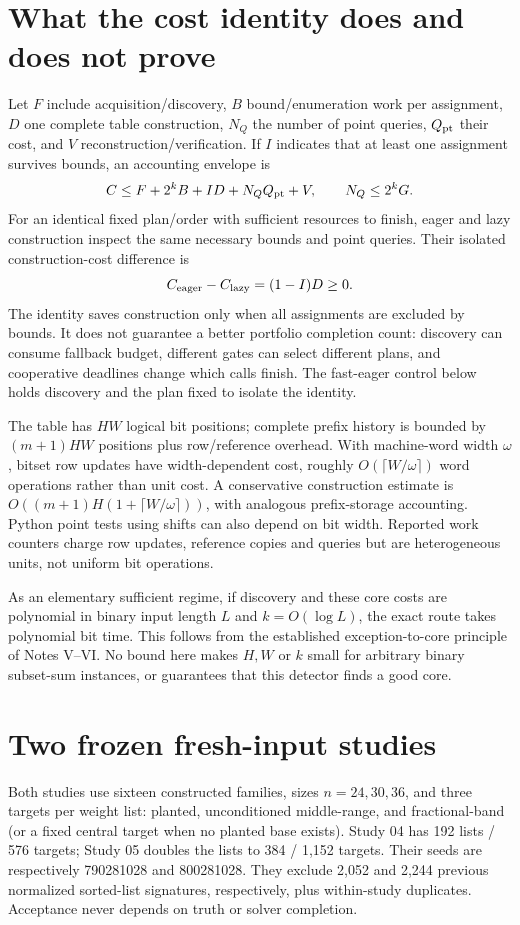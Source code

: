 \documentclass[10pt,english]{article}
\begin{document}
\section{What the cost identity does and does not prove}
Let $F$ include acquisition/discovery, $B$ bound/enumeration work per assignment, $D$ one complete table construction, $N_Q$ the number of point queries, $Q_{\rm pt}$ their cost, and $V$ reconstruction/verification. If $I$ indicates that at least one assignment survives bounds, an accounting envelope is
$$
C\le F+2^kB+I D+N_QQ_{\rm pt}+V,\qquad N_Q\le2^kG.
$$
For an identical fixed plan/order with sufficient resources to finish, eager and lazy construction inspect the same necessary bounds and point queries. Their isolated construction-cost difference is
$$
C_{\rm eager}-C_{\rm lazy}=(1-I)D\ge0.
$$
The identity saves construction only when all assignments are excluded by bounds. It does not guarantee a better portfolio completion count: discovery can consume fallback budget, different gates can select different plans, and cooperative deadlines change which calls finish. The fast-eager control below holds discovery and the plan fixed to isolate the identity.

The table has $HW$ logical bit positions; complete prefix history is bounded by $(m+1)HW$ positions plus row/reference overhead. With machine-word width $\omega$, bitset row updates have width-dependent cost, roughly $O(\lceil W/\omega\rceil)$ word operations rather than unit cost. A conservative construction estimate is $O((m+1)H(1+\lceil W/\omega\rceil))$, with analogous prefix-storage accounting. Python point tests using shifts can also depend on bit width. Reported work counters charge row updates, reference copies and queries but are heterogeneous units, not uniform bit operations.

As an elementary sufficient regime, if discovery and these core costs are polynomial in binary input length $L$ and $k=O(\log L)$, the exact route takes polynomial bit time. This follows from the established exception-to-core principle of Notes V--VI. No bound here makes $H,W$ or $k$ small for arbitrary binary subset-sum instances, or guarantees that this detector finds a good core.

\section{Two frozen fresh-input studies}
Both studies use sixteen constructed families, sizes $n=24,30,36$, and three targets per weight list: planted, unconditioned middle-range, and fractional-band (or a fixed central target when no planted base exists). Study 04 has 192 lists / 576 targets; Study 05 doubles the lists to 384 / 1,152 targets. Their seeds are respectively 790281028 and 800281028. They exclude 2,052 and 2,244 previous normalized sorted-list signatures, respectively, plus within-study duplicates. Acceptance never depends on truth or solver completion.
\end{document}
